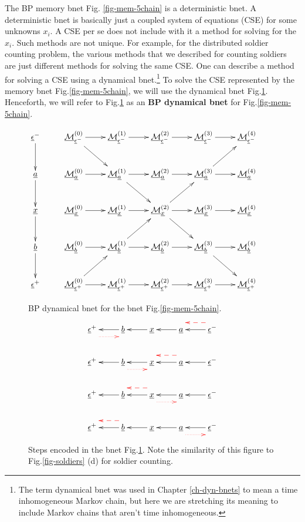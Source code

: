 The BP memory bnet
 Fig.
\ref{fig-mem-5chain}
is a deterministic bnet.
A deterministic bnet
is basically
just a coupled system
of equations (CSE)
for some unknowns $x_i$.
A CSE per se does not
include with it a method for
solving for the $x_i$. Such methods are not
unique.
For example,
for the
distributed
soldier counting
problem,
the various
methods that
we described
for counting soldiers
are just different
methods
for solving the same
CSE.
One can describe
a method for solving a
CSE using a dynamical bnet.\footnote{
The term
dynamical bnet
was used in Chapter \ref{ch-dyn-bnets}
to mean a time inhomogeneous
Markov chain, but
here we are stretching its meaning to
include
Markov chains
that aren't
time inhomogeneous.}
To solve
the CSE
represented by
the memory bnet Fig.\ref{fig-mem-5chain},
we will use the
dynamical bnet
Fig.\ref{fig-propagation-5chain}.
Henceforth,
we will refer to
Fig.\ref{fig-propagation-5chain} as
an {\bf BP dynamical bnet}
for Fig.\ref{fig-mem-5chain}.

\begin{figure}
$$\xymatrix{
\rveps^-\ar[d]
&\ucalm^{(0)}_{\rveps^-}\ar[r]\ar[dr]
&\ucalm^{(1)}_{\rveps^-}\ar[r]
&\ucalm^{(2)}_{\rveps^-}\ar[r]
&\ucalm^{(3)}_{\rveps^-}\ar[r]
&\ucalm^{(4)}_{\rveps^-}
&
\\
\rva\ar[d]
&\ucalm^{(0)}_{\rva}\ar[r]
&\ucalm^{(1)}_{\rva}\ar[r]\ar[dr]
&\ucalm^{(2)}_{\rva}\ar[r]
&\ucalm^{(3)}_{\rva}\ar[r]\ar[ur]
&\ucalm^{(4)}_{\rva}
\\
\rvx\ar[d]
&\ucalm^{(0)}_{\rvx}\ar[r]
&\ucalm^{(1)}_{\rvx}\ar[r]
&\ucalm^{(2)}_{\rvx}\ar[r]\ar[dr]\ar[ur]
&\ucalm^{(3)}_{\rvx}\ar[r]
&\ucalm^{(4)}_{\rvx}
\\
\rvb\ar[d]
&\ucalm^{(0)}_{\rvb}\ar[r]
&\ucalm^{(1)}_{\rvb}\ar[r]\ar[ur]
&\ucalm^{(2)}_{\rvb}\ar[r]
&\ucalm^{(3)}_{\rvb}\ar[r]\ar[dr]
&\ucalm^{(4)}_{\rvb}
\\
\rveps^+
&\ucalm^{(0)}_{\rveps^+}\ar[r]\ar[ur]
&\ucalm^{(1)}_{\rveps^+}\ar[r]
&\ucalm^{(2)}_{\rveps^+}\ar[r]
&\ucalm^{(3)}_{\rveps^+}\ar[r]
&\ucalm^{(4)}_{\rveps^+}
}$$
\caption{BP dynamical bnet for the bnet
  Fig.\ref{fig-mem-5chain}.}
\label{fig-propagation-5chain}
\end{figure}

\begin{figure}[h!]
$$
\xymatrix{
\rveps^+\ar@[red]@{.>}@<-2ex>[r]
&\rvb\ar[l]
&\rvx\ar[l]
&\rva\ar[l]
&\rveps^-\ar[l]\ar@[red]@{-->}@<-2ex>[l]
\\
\rveps^+
&\rvb\ar[l]\ar@[red]@{.>}@<-2ex>[r]
&\rvx\ar[l]
&\rva\ar[l]\ar@[red]@{-->}@<-2ex>[l]
&\rveps^-\ar[l]
\\
\rveps^+
&\rvb\ar[l]
&\rvx\ar[l]\ar@[red]@{.>}@<-2ex>[r]
\ar@[red]@{-->}@<-2ex>[l]
&\rva\ar[l]
&\rveps^-\ar[l]
\\
\rveps^+
&\rvb\ar[l]\ar@[red]@{-->}@<-2ex>[l]
&\rvx\ar[l]
&\rva\ar[l]\ar@[red]@{.>}@<-2ex>[r]
&\rveps^-\ar[l]
}$$
\caption{
Steps encoded in the
bnet
Fig.\ref{fig-propagation-5chain}.
Note the
similarity
of this figure
to Fig.\ref{fig-soldiers} (d)
for soldier counting.
}
\label{fig-multiframe-5chain}
\end{figure}

